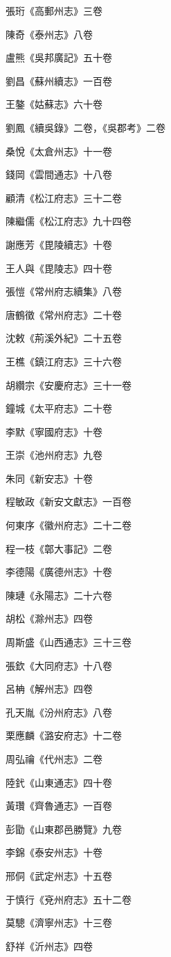 張珩《高郵州志》三卷

陳奇《泰州志》八卷

盧熊《吳邦廣記》五十卷

劉昌《蘇州續志》一百卷

王鏊《姑蘇志》六十卷

劉鳳《續吳錄》二卷，《吳郡考》二卷

桑悅《太倉州志》十一卷

錢岡《雲間通志》十八卷

顧清《松江府志》三十二卷

陳繼儒《松江府志》九十四卷

謝應芳《毘陵續志》十卷

王人與《毘陵志》四十卷

張愷《常州府志續集》八卷

唐鶴徵《常州府志》二十卷

沈敕《荊溪外紀》二十五卷

王樵《鎮江府志》三十六卷

胡纘宗《安慶府志》三十一卷

鐘城《太平府志》二十卷

李默《寧國府志》十卷

王崇《池州府志》九卷

朱同《新安志》十卷

程敏政《新安文獻志》一百卷

何東序《徽州府志》二十二卷

程一枝《鄣大事記》二卷

李德陽《廣德州志》十卷

陳璉《永陽志》二十六卷

胡松《滁州志》四卷

周斯盛《山西通志》三十三卷

張欽《大同府志》十八卷

呂柟《解州志》四卷

孔天胤《汾州府志》八卷

栗應麟《潞安府志》十二卷

周弘禴《代州志》二卷

陸釴《山東通志》四十卷

黃瓚《齊魯通志》一百卷

彭勖《山東郡邑勝覽》九卷

李錦《泰安州志》十卷

邢侗《武定州志》十五卷

于慎行《兗州府志》五十二卷

莫驄《濟寧州志》十三卷

舒祥《沂州志》四卷

